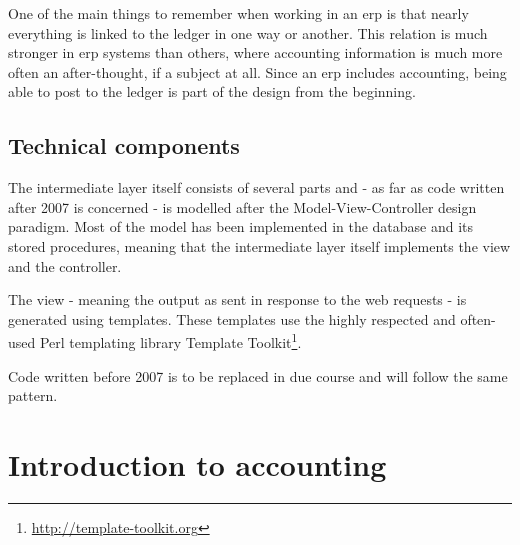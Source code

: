 One of the main things to remember when working in an \gls{erp} is that nearly everything is
linked to the ledger in one way or another.  This relation is much stronger in \gls{erp}
systems than others, where accounting information is much more often an after-thought,
if a subject at all.  Since an \gls{erp} includes accounting, being able to post to the
ledger is part of the design from the beginning.





\section{Technical components}

The intermediate layer itself consists of several parts and - as far as code written
after 2007 is concerned - is modelled after the Model-View-Controller design paradigm.
Most of the model has been implemented in the database and its stored procedures, meaning
that the intermediate layer itself implements the view and the controller.

The view - meaning the output as sent in response to the web requests - is generated
using templates.  These templates use the highly respected and often-used Perl templating
library Template Toolkit\footnote{\url{http://template-toolkit.org}}.

Code written before 2007 is to be replaced in due course and will follow the same
pattern.


\chapter{Introduction to accounting}
\label{cha:AccountingIntroduction}
